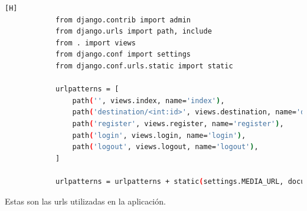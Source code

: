 \documentclass{article}
\begin{document}
    	\begin{lstlisting}[language=bash,caption={urls.py}][H]
            from django.contrib import admin
            from django.urls import path, include
            from . import views
            from django.conf import settings
            from django.conf.urls.static import static
            
            urlpatterns = [
                path('', views.index, name='index'),
                path('destination/<int:id>', views.destination, name='destination'),
                path('register', views.register, name='register'),
                path('login', views.login, name='login'),
                path('logout', views.logout, name='logout'),
            ]
            
            urlpatterns = urlpatterns + static(settings.MEDIA_URL, document_root=settings.MEDIA_ROOT) 
    	\end{lstlisting}
     
            Estas son las urls utilizadas en la aplicación.
\end{document}
